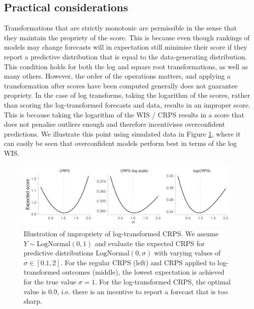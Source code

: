 \documentclass{article}
\begin{document}

\subsection{Practical considerations}
\label{sec:methods:considerations}

Transformations that are strictly monotonic are permissible in the sense that they maintain the propriety of the score. This is because even though rankings of models may change forecasts will in expectation still minimise their score if they report a predictive distribution that is equal to the data-generating distribution. This condition holds for both the log and square root transformations, as well as many others. However, the order of the operations matters, and applying a transformation after scores have been computed generally does not guarantee propriety. In the case of log transforms, taking the logarithm of the scores, rather than scoring the log-transformed forecasts and data, results in an improper score. This is because taking the logarithm of the WIS / CRPS results in a score that does not penalise outliers enough and therefore incentivises overconfident predictions. We illustrate this point using simulated data in Figure \ref{fig:log-improper}, where it can easily be seen that overconfident models perform best in terms of the log WIS. 

\begin{figure}[h!]
    \centering
    \includegraphics[width=0.99\textwidth]{output/figures/example-log-first.png}
    \caption{Illustration of impropriety of log-transformed CRPS. We assume $Y \sim \text{LogNormal}(0, 1)$ and evaluate the expected CRPS for predictive distributions $\text{LogNormal}(0, \sigma)$ with varying values of $\sigma \in [0.1, 2]$. For the regular CRPS (left) and CRPS applied to log-transformed outcomes (middle), the lowest expectation is achieved for the true value $\sigma = 1$. For the log-transformed CRPS, the optimal value is  0.9, i.e. there is an incentive to report a forecast that is too sharp.}
    \label{fig:log-improper}
\end{figure}
\end{document}
